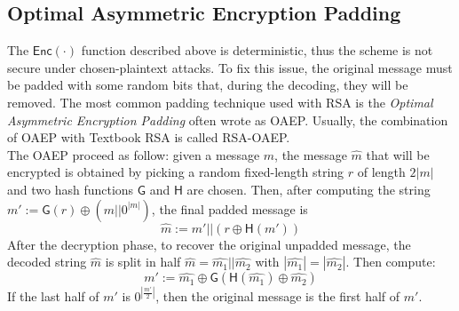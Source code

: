 \subsection{Optimal Asymmetric Encryption Padding}
The $\mathsf{Enc(\cdot)}$ function described above is deterministic, thus the scheme is not secure under chosen-plaintext attacks. To fix this issue, the original message must be padded with some random bits that, during the decoding, they will be removed. The most common padding technique used with RSA is the \emph{Optimal Asymmetric Encryption Padding} often wrote as OAEP. Usually, the combination of OAEP with Textbook RSA is called RSA-OAEP.\\
The OAEP proceed as follow: given a message $m$, the message $\hat{m}$ that will be encrypted is obtained by picking a random fixed-length string $r$ of length $2|m|$ and two hash functions $\mathsf{G}$ and $\mathsf{H}$ are chosen. Then, after computing the string $m' := \mathsf{G}(r) \oplus (m||0^{|m|})$, the final padded message is
$$
    \hat{m} := m'||(r \oplus \mathsf{H}(m'))
$$
After the decryption phase, to recover the original unpadded message, the decoded string $\hat{m}$ is split in half $\hat{m} = \hat{m_1}||\hat{m_2}$ with $|\hat{m_1}|=|\hat{m_2}|$. Then compute:
$$
    m' := \hat{m_1} \oplus \mathsf{G}(\mathsf{H}(\hat{m_1}) \oplus \hat{m_2})
$$
If the last half of $m'$ is $0^{|\frac{m'}{2}|}$, then the original message is the first half of $m'$.
